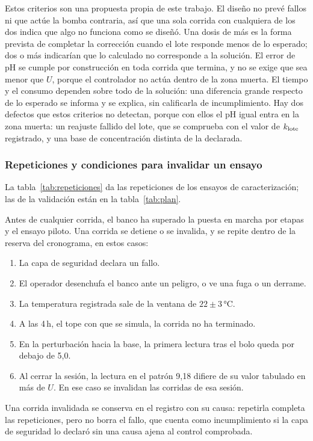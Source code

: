

Estos criterios son una propuesta propia de este trabajo. El diseño no prevé fallos ni que actúe la bomba contraria, así que una sola corrida con cualquiera de los dos indica que algo no funciona como se diseñó. Una dosis de más es la forma prevista de completar la corrección cuando el lote responde menos de lo esperado; dos o más indicarían que lo calculado no corresponde a la solución. El error de pH se cumple por construcción en toda corrida que termina, y no se exige que sea menor que $U$, porque el controlador no actúa dentro de la zona muerta. El tiempo y el consumo dependen sobre todo de la solución: una diferencia grande respecto de lo esperado se informa y se explica, sin calificarla de incumplimiento. Hay dos defectos que estos criterios no detectan, porque con ellos el pH igual entra en la zona muerta: un reajuste fallido del lote, que se comprueba con el valor de $k_{\text{lote}}$ registrado, y una base de concentración distinta de la declarada.

\subsubsection{Repeticiones y condiciones para invalidar un ensayo}\label{sec:repeticiones}
La tabla~\ref{tab:repeticiones} da las repeticiones de los ensayos de caracterización; las de la validación están en la tabla~\ref{tab:plan}.


Antes de cualquier corrida, el banco ha superado la puesta en marcha por etapas y el ensayo piloto. Una corrida se detiene o se invalida, y se repite dentro de la reserva del cronograma, en estos casos:
\begin{enumerate}
\item La capa de seguridad declara un fallo.
\item El operador desenchufa el banco ante un peligro, o ve una fuga o un derrame.
\item La temperatura registrada sale de la ventana de $22\pm3$\,°C.
\item A las 4\,h, el tope con que se simula, la corrida no ha terminado.
\item En la perturbación hacia la base, la primera lectura tras el bolo queda por debajo de 5,0.
\item Al cerrar la sesión, la lectura en el patrón 9,18 difiere de su valor tabulado en más de $U$. En ese caso se invalidan las corridas de esa sesión.
\end{enumerate}
Una corrida invalidada se conserva en el registro con su causa: repetirla completa las repeticiones, pero no borra el fallo, que cuenta como incumplimiento si la capa de seguridad lo declaró sin una causa ajena al control comprobada.

